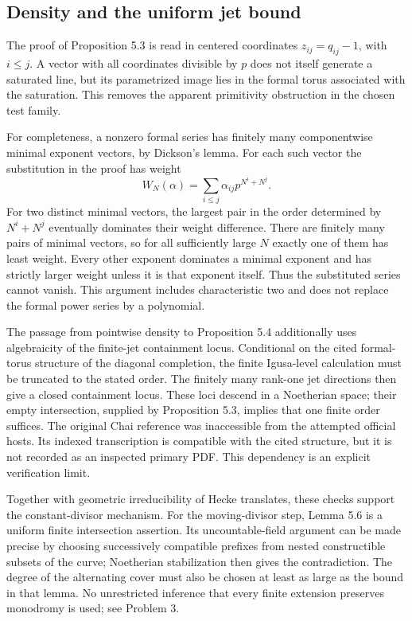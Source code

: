 \documentclass[10pt]{article}
\begin{document}
\subsection*{Density and the uniform jet bound}
The proof of Proposition 5.3 is read in centered coordinates \(z_{ij}=q_{ij}-1\), with \(i\leq j\). A vector with all coordinates divisible by \(p\) does not itself generate a saturated line, but its parametrized image lies in the formal torus associated with the saturation. This removes the apparent primitivity obstruction in the chosen test family.\par
For completeness, a nonzero formal series has finitely many componentwise minimal exponent vectors, by Dickson’s lemma. For each such vector the substitution in the proof has weight \[W_N(\alpha)=\sum_{i\leq j}\alpha_{ij}p^{N^i+N^j}.\] For two distinct minimal vectors, the largest pair in the order determined by \(N^i+N^j\) eventually dominates their weight difference. There are finitely many pairs of minimal vectors, so for all sufficiently large \(N\) exactly one of them has least weight. Every other exponent dominates a minimal exponent and has strictly larger weight unless it is that exponent itself. Thus the substituted series cannot vanish. This argument includes characteristic two and does not replace the formal power series by a polynomial.\par
The passage from pointwise density to Proposition 5.4 additionally uses algebraicity of the finite-jet containment locus. Conditional on the cited formal-torus structure of the diagonal completion, the finite Igusa-level calculation must be truncated to the stated order. The finitely many rank-one jet directions then give a closed containment locus. These loci descend in a Noetherian space; their empty intersection, supplied by Proposition 5.3, implies that one finite order suffices. The original Chai reference was inaccessible from the attempted official hosts. Its indexed transcription is compatible with the cited structure, but it is not recorded as an inspected primary PDF. This dependency is an explicit verification limit.\par
Together with geometric irreducibility of Hecke translates, these checks support the constant-divisor mechanism. For the moving-divisor step, Lemma 5.6 is a uniform finite intersection assertion. Its uncountable-field argument can be made precise by choosing successively compatible prefixes from nested constructible subsets of the curve; Noetherian stabilization then gives the contradiction. The degree of the alternating cover must also be chosen at least as large as the bound in that lemma. No unrestricted inference that every finite extension preserves monodromy is used; see Problem 3.\par
\end{document}
